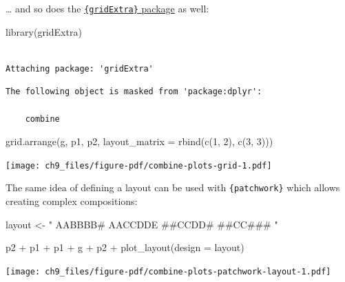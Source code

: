 \documentclass[
  letterpaper,
]{scrbook}
\newenvironment{Shaded}{\begin{snugshade}}{\end{snugshade}}
\newcommand{\AttributeTok}[1]{\textcolor[rgb]{0.40,0.45,0.13}{#1}}
\newcommand{\DecValTok}[1]{\textcolor[rgb]{0.68,0.00,0.00}{#1}}
\newcommand{\FunctionTok}[1]{\textcolor[rgb]{0.28,0.35,0.67}{#1}}
\newcommand{\NormalTok}[1]{\textcolor[rgb]{0.00,0.23,0.31}{#1}}
\newcommand{\OtherTok}[1]{\textcolor[rgb]{0.00,0.23,0.31}{#1}}
\newcommand{\SpecialCharTok}[1]{\textcolor[rgb]{0.37,0.37,0.37}{#1}}
\newcommand{\StringTok}[1]{\textcolor[rgb]{0.13,0.47,0.30}{#1}}
\begin{document}
\ldots{} and so does the
\href{https://cran.r-project.org/web/packages/gridExtra/vignettes/arrangeGrob.html}{\texttt{\{gridExtra\}}
package} as well:

\begin{Shaded}
\begin{Highlighting}[]
\FunctionTok{library}\NormalTok{(gridExtra)}
\end{Highlighting}
\end{Shaded}

\begin{verbatim}

Attaching package: 'gridExtra'
\end{verbatim}

\begin{verbatim}
The following object is masked from 'package:dplyr':

    combine
\end{verbatim}

\begin{Shaded}
\begin{Highlighting}[]
\FunctionTok{grid.arrange}\NormalTok{(g, p1, p2,}
             \AttributeTok{layout\_matrix =} \FunctionTok{rbind}\NormalTok{(}\FunctionTok{c}\NormalTok{(}\DecValTok{1}\NormalTok{, }\DecValTok{2}\NormalTok{), }\FunctionTok{c}\NormalTok{(}\DecValTok{3}\NormalTok{, }\DecValTok{3}\NormalTok{)))}
\end{Highlighting}
\end{Shaded}

\texttt{[image: ch9\_files/figure-pdf/combine-plots-grid-1.pdf]}

The same idea of defining a layout can be used with
\texttt{\{patchwork\}} which allows creating complex compositions:

\begin{Shaded}
\begin{Highlighting}[]
\NormalTok{layout }\OtherTok{\textless{}{-}} \StringTok{"}
\StringTok{AABBBB\#}
\StringTok{AACCDDE}
\StringTok{\#\#CCDD\#}
\StringTok{\#\#CC\#\#\#}
\StringTok{"}

\NormalTok{p2 }\SpecialCharTok{+}\NormalTok{ p1 }\SpecialCharTok{+}\NormalTok{ p1 }\SpecialCharTok{+}\NormalTok{ g }\SpecialCharTok{+}\NormalTok{ p2 }\SpecialCharTok{+}
  \FunctionTok{plot\_layout}\NormalTok{(}\AttributeTok{design =}\NormalTok{ layout)}
\end{Highlighting}
\end{Shaded}

\texttt{[image: ch9\_files/figure-pdf/combine-plots-patchwork-layout-1.pdf]}
\end{document}
